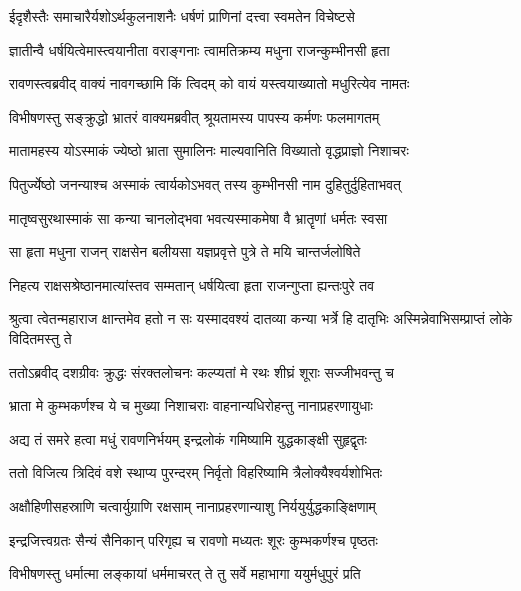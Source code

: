 \twolineshloka
{ईदृशैस्तैः समाचारैर्यशोऽर्थकुलनाशनैः}
{धर्षणं प्राणिनां दत्त्वा स्वमतेन विचेष्टसे} %

\twolineshloka
{ज्ञातीन्वै धर्षयित्वेमास्त्वयानीता वराङ्गनाः}
{त्वामतिक्रम्य मधुना राजन्कुम्भीनसी हृता} %

\twolineshloka
{रावणस्त्वब्रवीद् वाक्यं नावगच्छामि किं त्विदम्}
{को वायं यस्त्वयाख्यातो मधुरित्येव नामतः} %

\twolineshloka
{विभीषणस्तु सङ्क्रुद्धो भ्रातरं वाक्यमब्रवीत्}
{श्रूयतामस्य पापस्य कर्मणः फलमागतम्} %

\twolineshloka
{मातामहस्य योऽस्माकं ज्येष्ठो भ्राता सुमालिनः}
{माल्यवानिति विख्यातो वृद्धप्राज्ञो निशाचरः} %

\twolineshloka
{पितुर्ज्येष्ठो जनन्याश्च अस्माकं त्वार्यकोऽभवत्}
{तस्य कुम्भीनसी नाम दुहितुर्दुहिताभवत्} %

\twolineshloka
{मातृष्वसुरथास्माकं सा कन्या चानलोद्भवा}
{भवत्यस्माकमेषा वै भ्रातॄणां धर्मतः स्वसा} %

\twolineshloka
{सा हृता मधुना राजन् राक्षसेन बलीयसा}
{यज्ञप्रवृत्ते पुत्रे ते मयि चान्तर्जलोषिते} %

\twolineshloka
{निहत्य राक्षसश्रेष्ठानमात्यांस्तव सम्मतान्}
{धर्षयित्वा हृता राजन्गुप्ता ह्यन्तःपुरे तव} %

\threelineshloka
{श्रुत्वा त्वेतन्महाराज क्षान्तमेव हतो न सः}
{यस्मादवश्यं दातव्या कन्या भर्त्रे हि दातृभिः}
{अस्मिन्नेवाभिसम्प्राप्तं लोके विदितमस्तु ते} %

\twolineshloka
{ततोऽब्रवीद् दशग्रीवः क्रुद्धः संरक्तलोचनः}
{कल्प्यतां मे रथः शीघ्रं शूराः सज्जीभवन्तु च} %

\twolineshloka
{भ्राता मे कुम्भकर्णश्च ये च मुख्या निशाचराः}
{वाहनान्यधिरोहन्तु नानाप्रहरणायुधाः} %

\twolineshloka
{अद्य तं समरे हत्वा मधुं रावणनिर्भयम्}
{इन्द्रलोकं गमिष्यामि युद्धकाङ्क्षी सुहृद्वृतः} %

\twolineshloka
{ततो विजित्य त्रिदिवं वशे स्थाप्य पुरन्दरम्}
{निर्वृतो विहरिष्यामि त्रैलोक्यैश्वर्यशोभितः} %

\twolineshloka
{अक्षौहिणीसहस्राणि चत्वार्युग्राणि रक्षसाम्}
{नानाप्रहरणान्याशु निर्ययुर्युद्धकाङ्क्षिणाम्} %

\twolineshloka
{इन्द्रजित्त्वग्रतः सैन्यं सैनिकान् परिगृह्य च}
{रावणो मध्यतः शूरः कुम्भकर्णश्च पृष्ठतः} %

\twolineshloka
{विभीषणस्तु धर्मात्मा लङ्कायां धर्ममाचरत्}
{ते तु सर्वे महाभागा ययुर्मधुपुरं प्रति} %

